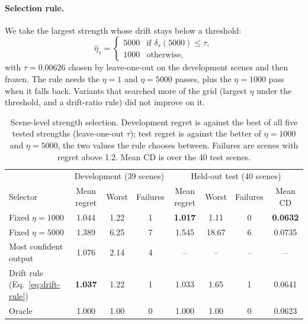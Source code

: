 \documentclass[sigconf,nonacm]{acmart}
\begin{document}
\paragraph{Selection rule.} We take the largest strength whose drift stays below a threshold:
\begin{equation}
\hat\eta_s=\begin{cases}5000 & \text{if } \delta_s(5000)\le\tau,\\ 1000 & \text{otherwise,}\end{cases}
\label{eq:drift-rule}
\end{equation}
with $\tau=0.00626$ chosen by leave-one-out on the development scenes and then frozen. The rule needs the $\eta=1$ and $\eta=5000$ passes, plus the $\eta=1000$ pass when it falls back. Variants that searched more of the grid (largest $\eta$ under the threshold, and a drift-ratio rule) did not improve on it.

\begin{table}[t]
\caption{Scene-level strength selection. Development regret is against the best of all five tested strengths (leave-one-out $\tau$); test regret is against the better of $\eta=1000$ and $\eta=5000$, the two values the rule chooses between. Failures are scenes with regret above 1.2. Mean CD is over the 40 test scenes.}
\label{tab:drift}
\small
\begin{tabular}{lccc|cccc}
\toprule
 & \multicolumn{3}{c|}{Development (39 scenes)} & \multicolumn{4}{c}{Held-out test (40 scenes)} \\
Selector & Mean regret & Worst & Failures & Mean regret & Worst & Failures & Mean CD \\
\midrule
Fixed $\eta=1000$ & 1.044 & 1.22 & 1 & \textbf{1.017} & 1.11 & 0 & \textbf{0.0632} \\
Fixed $\eta=5000$ & 1.389 & 6.25 & 7 & 1.545 & 18.67 & 6 & 0.0735 \\
Most confident output & 1.076 & 2.14 & 4 & -- & -- & -- & -- \\
Drift rule (Eq.~\ref{eq:drift-rule}) & \textbf{1.037} & 1.22 & 1 & 1.033 & 1.65 & 1 & 0.0641 \\
Oracle & 1.000 & 1.00 & 0 & 1.000 & 1.00 & 0 & 0.0623 \\
\bottomrule
\end{tabular}
\end{table}
\end{document}
